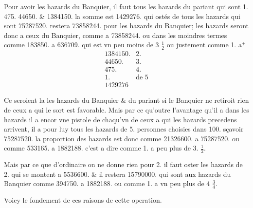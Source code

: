 \documentclass[11pt,a4paper]{article}
\begin{document}
Pour avoir les hazards du Banquier, il faut   tous les hazards du  pariant qui sont 1. 475. 44650. \& 1384150. la somme est 1429276. qui  ostés de tous les hazards qui sont  75287520. \struck{\ill{}} restera 73858244. pour les hazards du Banquier; les hazards  seront donc a ceux du Banquier, comme   a 73858244. ou dans les moindres termes comme 183850. a 636709. qui est  vn peu moins de \struck{\ill{}} 3 $\frac{1}{2}$ ou justement comme 1. a${}^{+}$
\[
\begin{array}{rl}
1384150. & 2. \\
44650. & 3. \\
475. & 4. \\
1. & \text{de 5} \\
\hline
1429276 &
\end{array}
\]

Ce seroient la les hazards du Banquier \& du pariant si le Banquier ne retiroit rien de ceux a qui le sort est favorable. Mais par ce qu'outre \struck{\ill{}} l'avantage qu'il a dans les hazards il a encor vne pistole de \struck{\ill{}} chaqu'vn de ceux a qui les hazards precedens arrivent, il a pour luy tous les hazards de 5. personnes choisies dans 100. sçavoir 75287520. la proportion  des hazards  est donc  comme 21326600. a 75287520. ou comme \struck{\ill{}} 533165. a 1882188. c'est a dire comme 1. a  peu plus de 3.  $\frac{1}{2}$.

Mais par ce que d'ordinaire on ne donne rien pour 2. il faut oster  les hazards de 2. qui se montent a 5536600. \& il restera 15790000. qui sont aux hazards du Banquier comme 394750. a 1882188. ou comme 1. a \struck{\ill{}} vn peu plus de 4 $\frac{3}{4}$.

Voicy \struck{\ill{}} le fondement de ces raisons de cette operation.
\end{document}
